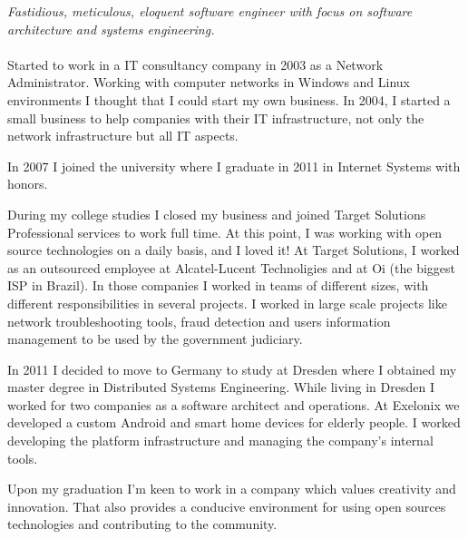 \documentclass[10pt,a4paper]{article}
\begin{document}
\vspace{-1.3em}  %
\begin{multicols}{2}  %
\noindent \emph{Fastidious, meticulous, eloquent software engineer with focus on software architecture and systems engineering.}
\\
\\
Started to work in a IT consultancy company in 2003 as a Network Administrator. Working with computer networks in Windows and Linux environments I thought that I could start my own business. In 2004, I started a small business to help companies with their IT infrastructure, not only the network infrastructure but all IT aspects.

In 2007 I joined the  university where I graduate in 2011 in Internet Systems with honors.

During my college studies I closed my business and joined Target Solutions Professional services to work full time. At this point, I was working with open source technologies on a daily basis, and I loved it! At Target Solutions, I worked as an outsourced employee at Alcatel-Lucent Technoligies and at Oi (the biggest ISP in Brazil). In those companies I worked in teams of different sizes, with different responsibilities in several projects. I worked in large scale projects like network troubleshooting tools, fraud detection and users information management to be used by the government judiciary.

In 2011 I decided to move to Germany to study at  Dresden where I obtained my master degree in Distributed Systems Engineering. While living in Dresden I worked for two companies as a software architect and operations. At Exelonix we developed a custom Android and smart home devices for elderly people. I worked developing the platform infrastructure and managing the company's internal tools.


Upon my graduation I'm keen to work in a company which values creativity and innovation. That also provides a conducive environment for using open sources technologies and contributing to the community.

\end{multicols}
\end{document}
